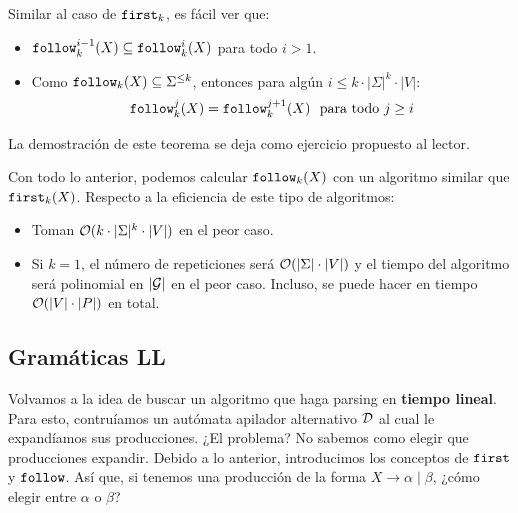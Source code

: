Similar al caso de $\texttt{first}_k$, es fácil ver que:
\begin{itemize}
    \item $\texttt{follow}_k^{i-1}(X) \subseteq \texttt{follow}_k^i(X)$ para todo $i > 1$.
    \item Como $\texttt{follow}_k(X) \subseteq \Sigma^{\le k}$, entonces para algún $i \le k \cdot |\Sigma|^k \cdot |V|$:
          $$
              \texttt{follow}_k^j(X)=\texttt{follow}_k^{j+1}(X) \ \text{ para todo } j \ge i
          $$
\end{itemize}
La demostración de este teorema se deja como ejercicio propuesto al lector. \medbreak

Con todo lo anterior, podemos calcular $\texttt{follow}_k(X)$ con un algoritmo similar que $\texttt{first}_k(X)$. Respecto a la eficiencia de este tipo de algoritmos:
\begin{itemize}
    \item Toman $\mathcal{O}(k\cdot |\Sigma|^k\cdot|V|)$ en el peor caso.
    \item Si $k = 1$, el número de repeticiones será $\mathcal{O}(|\Sigma|\cdot |V|)$ y el tiempo del algoritmo será polinomial en $|\mathcal{G}|$ en el peor caso. Incluso, se puede hacer en tiempo $\mathcal{O}(|V|\cdot |P|)$ en total.
\end{itemize}

\subsection{Gramáticas LL}
Volvamos a la idea de buscar un algoritmo que haga parsing en \textbf{tiempo lineal}. Para esto, contruíamos un autómata apilador alternativo $\mathcal{D}$ al cual le expandíamos sus producciones. ¿El problema? No sabemos como elegir que producciones expandir. Debido a lo anterior, introducimos los conceptos de $\texttt{first}$ y $\texttt{follow}$. Así que, si tenemos una producción de la forma $X \to \alpha \mid \beta$, ¿cómo elegir entre $\alpha$ o $\beta$?

